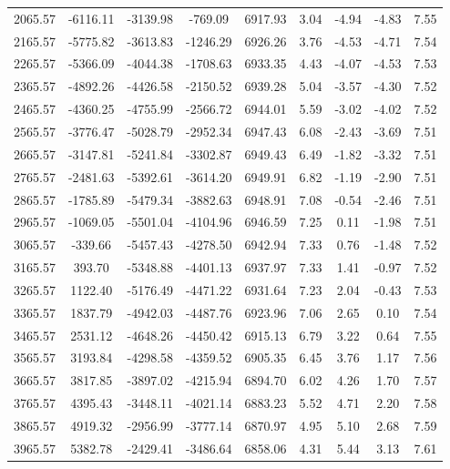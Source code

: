 \begin{center}
\begin{longtable}{|c|c|c|c|c|c|c|c|c|}
    2065.57 & -6116.11 & -3139.98 & -769.09  & 6917.93 & 3.04 &  -4.94 &  -4.83 & 7.55 \\ 
    2165.57 & -5775.82 & -3613.83 & -1246.29  & 6926.26 & 3.76 &  -4.53 &  -4.71 & 7.54 \\ 
    2265.57 & -5366.09 & -4044.38 & -1708.63  & 6933.35 & 4.43 &  -4.07 &  -4.53 & 7.53 \\ 
    2365.57 & -4892.26 & -4426.58 & -2150.52  & 6939.28 & 5.04 &  -3.57 &  -4.30 & 7.52 \\ 
    2465.57 & -4360.25 & -4755.99 & -2566.72  & 6944.01 & 5.59 &  -3.02 &  -4.02 & 7.52 \\ 
    2565.57 & -3776.47 & -5028.79 & -2952.34  & 6947.43 & 6.08 &  -2.43 &  -3.69 & 7.51 \\ 
    2665.57 & -3147.81 & -5241.84 & -3302.87  & 6949.43 & 6.49 &  -1.82 &  -3.32 & 7.51 \\ 
    2765.57 & -2481.63 & -5392.61 & -3614.20  & 6949.91 & 6.82 &  -1.19 &  -2.90 & 7.51 \\ 
    2865.57 & -1785.89 & -5479.34 & -3882.63  & 6948.91 & 7.08 &  -0.54 &  -2.46 & 7.51 \\ 
    2965.57 & -1069.05 & -5501.04 & -4104.96  & 6946.59 & 7.25 &  0.11 &  -1.98 & 7.51 \\ 
    3065.57 & -339.66 & -5457.43 & -4278.50  & 6942.94 & 7.33 &  0.76 &  -1.48 & 7.52 \\ 
    3165.57 & 393.70 & -5348.88 & -4401.13  & 6937.97 & 7.33 &  1.41 &  -0.97 & 7.52 \\ 
    3265.57 & 1122.40 & -5176.49 & -4471.22  & 6931.64 & 7.23 &  2.04 &  -0.43 & 7.53 \\ 
    3365.57 & 1837.79 & -4942.03 & -4487.76  & 6923.96 & 7.06 &  2.65 &  0.10 & 7.54 \\ 
    3465.57 & 2531.12 & -4648.26 & -4450.42  & 6915.13 & 6.79 &  3.22 &  0.64 & 7.55 \\ 
    3565.57 & 3193.84 & -4298.58 & -4359.52  & 6905.35 & 6.45 &  3.76 &  1.17 & 7.56 \\ 
    3665.57 & 3817.85 & -3897.02 & -4215.94  & 6894.70 & 6.02 &  4.26 &  1.70 & 7.57 \\ 
    3765.57 & 4395.43 & -3448.11 & -4021.14  & 6883.23 & 5.52 &  4.71 &  2.20 & 7.58 \\ 
    3865.57 & 4919.32 & -2956.99 & -3777.14  & 6870.97 & 4.95 &  5.10 &  2.68 & 7.59 \\ 
    3965.57 & 5382.78 & -2429.41 & -3486.64  & 6858.06 & 4.31 &  5.44 &  3.13 & 7.61 \\ 

\end{longtable}
\end{center}
